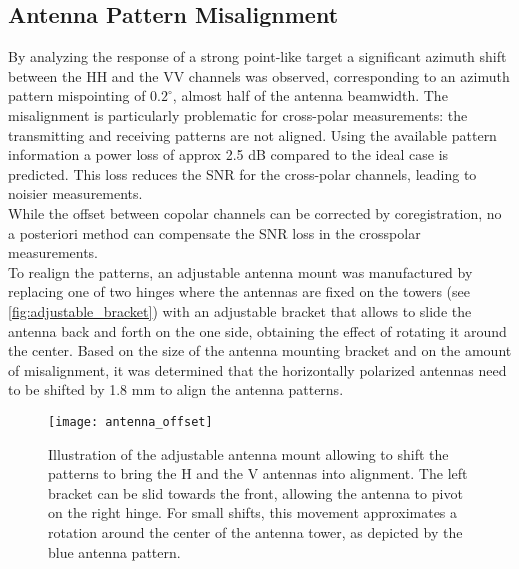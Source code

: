 \subsection{Antenna Pattern Misalignment}\label{sec:methods:misalingment}
By analyzing the response of a strong point-like target a significant azimuth shift between the HH and the VV channels was observed, corresponding to an azimuth pattern mispointing of $0.2^\circ$, almost half of the antenna beamwidth.
The misalignment is particularly problematic for cross-polar measurements: the transmitting and receiving patterns are not aligned. Using the available pattern information a power loss of approx 2.5 dB  compared to the ideal case is predicted. This loss reduces the SNR for the cross-polar channels, leading to noisier measurements.\\ While the offset between copolar channels can be corrected by coregistration, no a posteriori method can compensate the SNR loss in the crosspolar measurements.\\ To realign the patterns, an adjustable antenna mount was manufactured by replacing one of two hinges where the antennas are fixed on the towers (see \autoref{fig:adjustable_bracket}) with an adjustable bracket that allows to slide the antenna back and forth on the one side, obtaining the effect of rotating it around the center. Based on the size of the antenna mounting bracket and on the amount of misalignment, it was determined that the horizontally polarized antennas need to be shifted by 1.8 mm to align the antenna patterns.
\begin{figure}[ht!]
	\centering
	\texttt{[image: antenna\_offset]}
	\caption{Illustration of the adjustable antenna mount allowing to shift the patterns to bring the H and the V antennas into alignment. The left bracket can be slid towards the front, allowing the antenna to pivot on the right hinge. For small shifts, this movement approximates a rotation around the center of the antenna tower, as depicted by the blue antenna pattern.}
	\label{fig:adjustable_bracket}
\end{figure}
